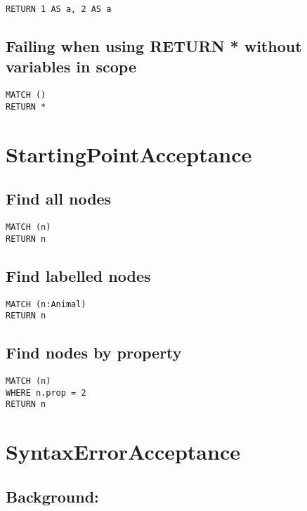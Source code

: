 \begin{lstlisting}
RETURN 1 AS a, 2 AS a
\end{lstlisting}

\subsection{Failing when using RETURN * without variables in scope}

\begin{lstlisting}
MATCH ()
RETURN *
\end{lstlisting}
\section{StartingPointAcceptance}


\subsection{Find all nodes}

\begin{lstlisting}
MATCH (n)
RETURN n
\end{lstlisting}

\subsection{Find labelled nodes}

\begin{lstlisting}
MATCH (n:Animal)
RETURN n
\end{lstlisting}

\subsection{Find nodes by property}

\begin{lstlisting}
MATCH (n)
WHERE n.prop = 2
RETURN n
\end{lstlisting}
\section{SyntaxErrorAcceptance}


\subsection{Background:}

\begin{lstlisting}
\end{lstlisting}

